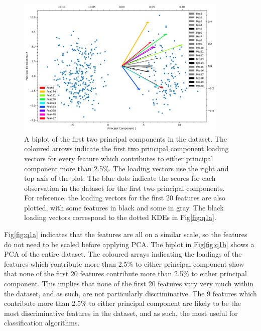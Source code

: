     \begin{figure}[htb]
    \centering
    \includegraphics[width=0.9\textwidth]{./figures/q1b}
    \caption{A biplot of the first two principal components in the dataset.
        The coloured arrows indicate the first two principal component loading vectors for every feature which contributes to
        either principal component more than 2.5\%. The loading vectors use the right and top axis of the plot. The blue dots
        indicate the scores for each observation in the dataset for the first two principal components. For reference, the
        loading vectors for the first 20 features are also plotted, with some features in black and some in gray. The black
        loading vectors correspond to the dotted KDEs in Fig\eqref{fig:q1a}.}
    \label{fig:q1b}
    \end{figure}

    Fig\eqref{fig:q1a} indicates that the features are all on a similar scale, so the features do not need to be scaled
    before applying PCA.
    The biplot in Fig\eqref{fig:q1b} shows a PCA of the entire dataset.
    The coloured arrays indicating the loadings of the features which contribute more than 2.5\% to either principal
    component show that none of the first 20 features contribute more than 2.5\% to either principal component.
    This implies that none of the first 20 features vary very much within the dataset, and as such, are not particularly
    discriminative.
    The 9 features which contribute more than 2.5\% to either principal component are likely to be the most discriminative
    features in the dataset, and as such, the most useful for classification algorithms.
